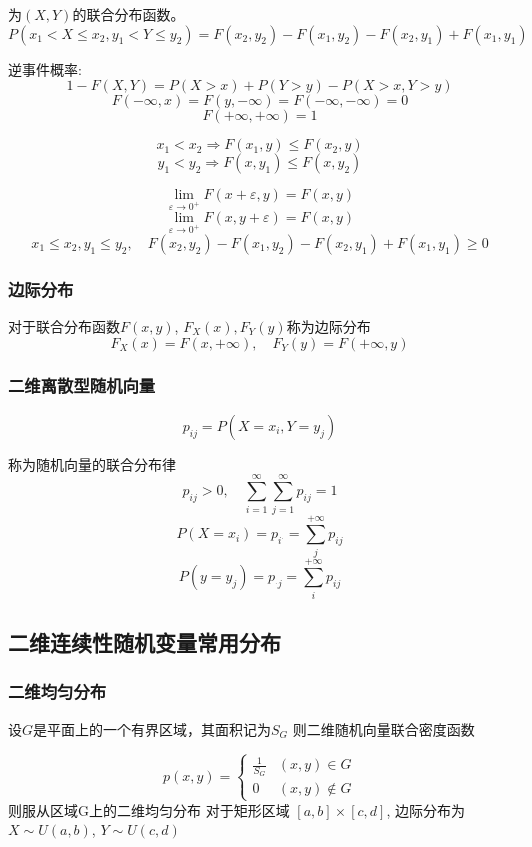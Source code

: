 \documentclass[10pt, a4paper]{article}
\begin{document}
            为$(X, Y)$的联合分布函数。
            $$P(x_1 < X \leqslant x_2, y_1 < Y \leqslant y_2) = F(x_2, y_2) - F(x_1, y_2) - F(x_2, y_1) + F(x_1, y_1)$$

            逆事件概率:
            $$1 - F(X, Y) = P(X > x) + P(Y > y) - P(X > x, Y > y)$$
            $$F(-\infty, x) = F(y, -\infty) = F(-\infty, -\infty) = 0$$
            $$F(+\infty, +\infty) = 1$$

            $$x_1 < x_2 \Rightarrow F(x_1, y) \leqslant F(x_2, y)$$
            $$y_1 < y_2 \Rightarrow F(x, y_1) \leqslant F(x, y_2)$$

            $$\lim_{\varepsilon \rightarrow 0^+}F(x + \varepsilon, y) = F(x, y)$$
            $$\lim_{\varepsilon \rightarrow 0^+}F(x, y + \varepsilon) = F(x, y)$$
            $$x_1\leqslant x_2, y_1 \leqslant y_2, \quad F(x_2, y_2) - F(x_1, y_2) - F(x_2, y_1) + F(x_1, y_1) \geqslant 0$$
        
        \subsubsection{边际分布}
            对于联合分布函数$F(x, y)$, $F_X(x), F_Y(y)$称为边际分布 
                $$F_X(x) = F(x, +\infty),\quad F_Y(y) = F(+\infty, y)$$
        \subsubsection{二维离散型随机向量}
            $$p_{ij} = P(X = x_i, Y = y_j)$$
            
            称为随机向量的联合分布律
            $$p_{ij} > 0,\quad\sum_{i = 1}^{\infty}\sum_{j = 1}^{\infty}p_{ij} = 1$$
            $$P(X = x_i) = p_{i^{.}} = \sum_{j}^{+\infty}p_{ij}$$
            $$P(y = y_j) = p_{^{.}j} = \sum_{i}^{+\infty}p_{ij}$$
    
    \subsection{二维连续性随机变量常用分布}
        \subsubsection{二维均匀分布}
            设$G$是平面上的一个有界区域，其面积记为$S_G$ 则二维随机向量联合密度函数

            $$p(x,y) = \begin{cases}
                \frac{1}{S_G} & (x, y) \in G \\
                0 & (x, y) \notin G 
            \end{cases}$$
            则服从区域G上的二维均匀分布
            对于矩形区域 $[a, b] \times [c, d]$, 边际分布为 $X \sim U(a, b)$, $Y \sim U(c,d)$
\end{document}

